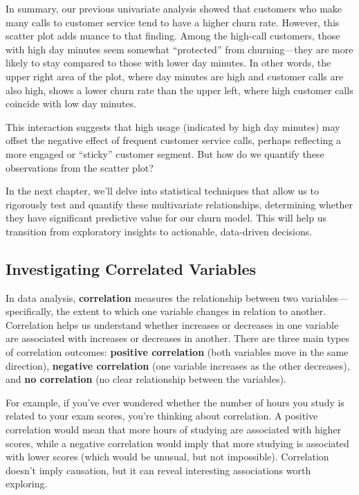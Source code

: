 \documentclass[
]{book}
\theoremstyle{definition}
\theoremstyle{definition}
\theoremstyle{definition}
\theoremstyle{definition}
\theoremstyle{remark}
\begin{document}
In summary, our previous univariate analysis showed that customers who make many calls to customer service tend to have a higher churn rate. However, this scatter plot adds nuance to that finding. Among the high-call customers, those with high day minutes seem somewhat ``protected'' from churning---they are more likely to stay compared to those with lower day minutes. In other words, the upper right area of the plot, where day minutes are high and customer calls are also high, shows a lower churn rate than the upper left, where high customer calls coincide with low day minutes.

This interaction suggests that high usage (indicated by high day minutes) may offset the negative effect of frequent customer service calls, perhaps reflecting a more engaged or ``sticky'' customer segment. But how do we quantify these observations from the scatter plot?

In the next chapter, we'll delve into statistical techniques that allow us to rigorously test and quantify these multivariate relationships, determining whether they have significant predictive value for our churn model. This will help us transition from exploratory insights to actionable, data-driven decisions.

\subsection{Investigating Correlated Variables}\label{investigating-correlated-variables}

In data analysis, \textbf{correlation} measures the relationship between two variables---specifically, the extent to which one variable changes in relation to another. Correlation helps us understand whether increases or decreases in one variable are associated with increases or decreases in another. There are three main types of correlation outcomes: \textbf{positive correlation} (both variables move in the same direction), \textbf{negative correlation} (one variable increases as the other decreases), and \textbf{no correlation} (no clear relationship between the variables).

For example, if you've ever wondered whether the number of hours you study is related to your exam scores, you're thinking about correlation. A positive correlation would mean that more hours of studying are associated with higher scores, while a negative correlation would imply that more studying is associated with lower scores (which would be unusual, but not impossible). Correlation doesn't imply causation, but it can reveal interesting associations worth exploring.
\end{document}
